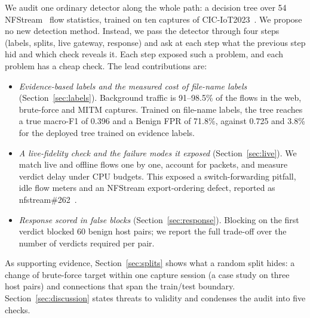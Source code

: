 We audit one ordinary detector along the whole path: a decision tree over 54 NFStream~\cite{aouini2022nfstream} flow statistics, trained on ten captures of CIC-IoT2023~\cite{neto2023ciciot2023}. We propose no new detection method. Instead, we pass the detector through four steps (labels, splits, live gateway, response) and ask at each step what the previous step hid and which check reveals it. Each step exposed such a problem, and each problem has a cheap check. The lead contributions are:
\begin{itemize}
\item \emph{Evidence-based labels and the measured cost of file-name labels} (Section~\ref{sec:labels}). Background traffic is 91--98.5\% of the flows in the web, brute-force and MITM captures. Trained on file-name labels, the tree reaches a true macro-F1 of 0.396 and a Benign FPR of 71.8\%, against 0.725 and 3.8\% for the deployed tree trained on evidence labels.
\item \emph{A live-fidelity check and the failure modes it exposed} (Section~\ref{sec:live}). We match live and offline flows one by one, account for packets, and measure verdict delay under CPU budgets. This exposed a switch-forwarding pitfall, idle flow meters and an NFStream export-ordering defect, reported as nfstream\#262~\cite{nfstream262}.
\item \emph{Response scored in false blocks} (Section~\ref{sec:response}). Blocking on the first verdict blocked 60 benign host pairs; we report the full trade-off over the number of verdicts required per pair.
\end{itemize}
As supporting evidence, Section~\ref{sec:splits} shows what a random split hides: a change of brute-force target within one capture session (a case study on three host pairs) and connections that span the train/test boundary.
Section~\ref{sec:discussion} states threats to validity and condenses the audit into five checks.
